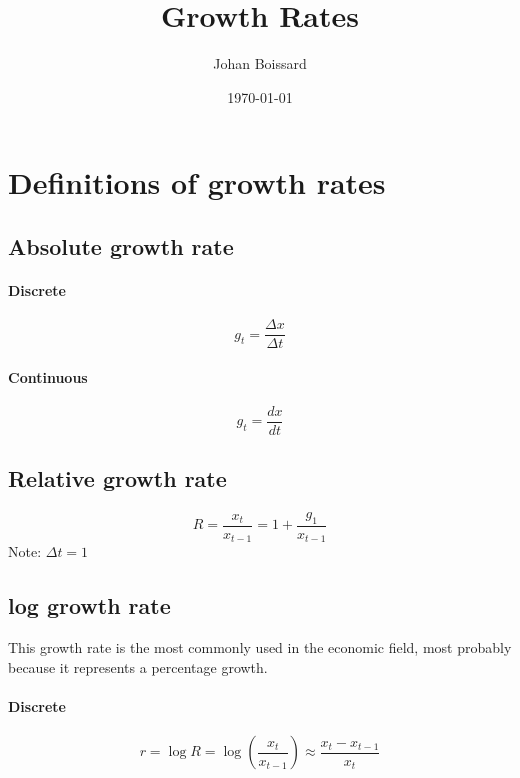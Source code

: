\documentclass[a4paper] {scrartcl}
\author{Johan Boissard}
\date{\today}
\title{Growth Rates}
\begin{document}
\maketitle


\section{Definitions of growth rates}
\subsection{Absolute growth rate}
\paragraph{Discrete}
\begin{equation}
	g_{t} = \frac{\Delta x}{\Delta t}
\end{equation}
\paragraph{Continuous} %
\label{par:continuousa}
\begin{equation}
	g_{t}=\frac{dx}{dt}
\end{equation}
\subsection{Relative growth rate}
\begin{equation}
	R = \frac{x_{t}}{x_{t-1}}
	=
	1+
	\frac{
		g_{1}
	}{
		x_{t-1}
	}
\end{equation}
Note: $\Delta t=1$

\subsection{log growth rate}
This growth rate is the most commonly used in the economic field, most probably because it represents a percentage growth.

\paragraph{Discrete} %
\label{par:discrete}


\begin{equation}
	r 
	= \log{R} 
	= \log{\left(\frac{x_{t}}{x_{t-1}}\right)}
	\approx
	\frac{x_{t}-x_{t-1}}{x_{t}}
\end{equation}
\end{document}
